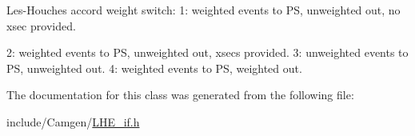 Les-\/\-Houches accord weight switch\-: 1\-: weighted events to P\-S, unweighted out, no xsec provided. 

2\-: weighted events to P\-S, unweighted out, xsecs provided. 3\-: unweighted events to P\-S, unweighted out. 4\-: weighted events to P\-S, weighted out. 

The documentation for this class was generated from the following file\-:\begin{DoxyCompactItemize}
\item 
include/\-Camgen/\hyperlink{a00659}{L\-H\-E\-\_\-if.\-h}\end{DoxyCompactItemize}
